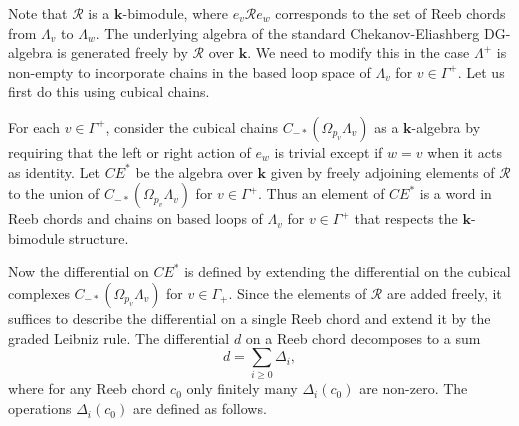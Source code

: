 \documentclass{gtpart}
\renewcommand{\k}{\mathbf{k}}
\begin{document}
Note that $\mathcal{R}$ is a $\k$-bimodule, where $e_v \mathcal{R} e_w$ corresponds to the set of
Reeb chords from $\Lambda_v$ to $\Lambda_w$. The underlying algebra of the standard
Chekanov-Eliashberg DG-algebra is generated freely by $\mathcal{R}$ over $\k$. We need to
modify this in the case $\Lambda^+$ is non-empty to incorporate chains in the based loop space of
$\Lambda_v$ for $v\in \Gamma^+$. Let us first do this using cubical chains.  

For each $v \in \Gamma^+$, consider the cubical chains
$C_{-*}(\Omega_{p_v}\Lambda_v)$ as a $\k$-algebra by requiring that the left or right
action of $e_w$ is trivial except if $w=v$ when it acts as identity. Let $CE^*$ be the algebra over $\k$ given by freely adjoining elements of $\mathcal{R}$ to the union
of $C_{-*}(\Omega_{p_v} \Lambda_v)$ for $v \in \Gamma^+$. Thus an element of $CE^*$ is a word in Reeb chords and
chains on based loops of $\Lambda_v$ for $v \in \Gamma^+$ that respects the $\k$-bimodule structure. 

Now the differential on $CE^*$ is defined by extending the differential on the cubical complexes
$C_{-*}(\Omega_{p_v}\Lambda_v)$ for $v \in \Gamma_+$. Since the elements of $\mathcal{R}$ are added
freely, it suffices to describe the differential on a single Reeb chord and extend it by the graded
Leibniz rule. The differential $d$ on a Reeb chord decomposes to a sum 
\[ d = \sum_{i \geq 0} \Delta_i, \]
where for any Reeb chord $c_0$ only finitely many $\Delta_i(c_0)$ are non-zero. The operations $\Delta_{i}(c_{0})$ are defined as follows.
\end{document}
